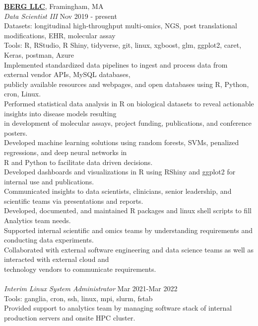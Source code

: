 \documentclass[a4paper]{article}
\newcommand{\mybullet}{
	\indent 
  \textbullet \hspace*{2mm}
}
\begin{document}
  \noindent
  \textbf{\href{https://www.berghealth.com/}{BERG LLC}}, Framingham, MA \\
  \textit{Data Scientist III} \hfill Nov 2019 - present \\
  Datasets: longitudinal high-throughput multi-omics, NGS, post translational modifications, EHR, molecular assay \\
  Tools: R, RStudio, R Shiny, tidyverse, git, linux, xgboost, glm, ggplot2, caret, Keras, postman, Azure \\
  \mybullet Implemented standardized data pipelines to ingest and process data from external vendor APIs, MySQL databases, 
  \\\hspace*{10mm}publicly available resources and webpages, and open databases using R, Python, cron, Linux. \\
  \mybullet Performed statistical data analysis in R on biological datasets to reveal actionable insights into disease models resulting \\\hspace*{10mm}in development of molecular assays, project funding, publications, and conference posters.\\
  \mybullet Developed machine learning solutions using random forests, SVMs, penalized regressions, and deep neural networks in \\\hspace*{10mm}R and Python to facilitate data driven decisions. \\
  \mybullet Developed dashboards and visualizations in R using RShiny and ggplot2 for internal use and publications. \\
  \mybullet Communicated insights to data scientists, clinicians, senior leadership, and scientific teams via presentations and reports. \\
  \mybullet Developed, documented, and maintained R packages and linux shell scripts to fill Analytics team needs. \\
  \mybullet Supported internal scientific and omics teams by understanding requirements and conducting data experiments. \\
  \mybullet Collaborated with external software engineering and data science teams as well as interacted with external cloud and \\\hspace*{10mm}technology vendors to communicate requirements. \\ \\ 
  \textit{Interim Linux System Administrator} \hfill Mar 2021-Mar 2022 \\ Tools: ganglia, cron, ssh, linux, mpi, slurm, fstab  \\
  \mybullet Provided support to analytics team by managing software stack of internal production servers and onsite HPC cluster. \\
\end{document}

